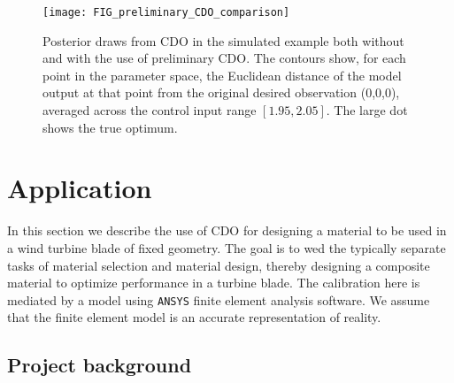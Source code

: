 \documentclass[12pt]{article}
\begin{document}
\begin{figure}
\centering
\texttt{[image: FIG\_preliminary\_CDO\_comparison]}
\caption{Posterior draws from CDO in the simulated example both without and with the use of preliminary CDO. The contours show, for each point in the parameter space, the Euclidean distance of the model output at that point from the original desired observation (0,0,0), averaged across the control input range $[1.95,2.05]$. The large dot shows the true optimum.}
\label{fig:toy_sim_results}
\end{figure}



\section{Application}\label{application}

In this section we describe the use of CDO for designing a material to be used in a wind turbine blade of fixed geometry. 
%
The goal is to wed the typically separate tasks of material selection and material design, thereby designing a composite material to optimize performance in a turbine blade.
%
The calibration here is mediated by a model using \texttt{ANSYS} finite element analysis software. 
%
We assume that the finite element model is an accurate representation of reality.

\subsection{Project background}
\end{document}
